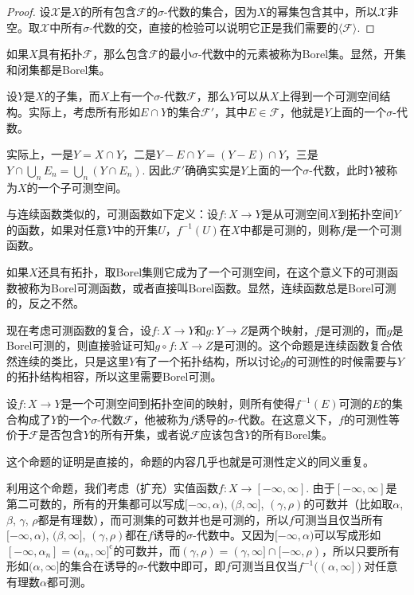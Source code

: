 \begin{proof}
设$\mathscr{X}$是$X$的所有包含$\mathcal{F}$的$\sigma$-代数的集合，因为$X$的幂集包含其中，所以$\mathscr{X}$非空。取$\mathscr{X}$中所有$\sigma$-代数的交，直接的检验可以说明它正是我们需要的$\langle \mathcal{F}\rangle$.
\end{proof}

如果$X$具有拓扑$\mathcal{F}$，那么包含$\mathcal{F}$的最小$\sigma$-代数中的元素被称为Borel集。显然，开集和闭集都是Borel集。

\begin{para}
设$Y$是$X$的子集，而$X$上有一个$\sigma$-代数$\mathcal{F}$，那么$Y$可以从$X$上得到一个可测空间结构。实际上，考虑所有形如$E\cap Y$的集合$\mathcal{F}'$，其中$E\in \mathcal{F}$，他就是$Y$上面的一个$\sigma$-代数。

实际上，一是$Y=X\cap Y$，二是$Y-E\cap Y=(Y-E)\cap Y$，三是$Y\cap \bigcup_n E_n=\bigcup_n (Y\cap E_n)$. 因此$\mathcal{F}'$确确实实是$Y$上面的一个$\sigma$-代数，此时$Y$被称为$X$的一个子可测空间。
\end{para}

\begin{para}
与连续函数类似的，可测函数如下定义：设$f:X\to Y$是从可测空间$X$到拓扑空间$Y$的函数，如果对任意$Y$中的开集$U$，$f^{-1}(U)$在$X$中都是可测的，则称$f$是一个可测函数。

如果$X$还具有拓扑，取Borel集则它成为了一个可测空间，在这个意义下的可测函数被称为Borel可测函数，或者直接叫Borel函数。显然，连续函数总是Borel可测的，反之不然。

现在考虑可测函数的复合，设$f:X\to Y$和$g:Y\to Z$是两个映射，$f$是可测的，而$g$是Borel可测的，则直接验证可知$g\circ f:X\to Z$是可测的。这个命题是连续函数复合依然连续的类比，只是这里$Y$有了一个拓扑结构，所以讨论$g$的可测性的时候需要与$Y$的拓扑结构相容，所以这里需要Borel可测。
\end{para}

\begin{pro}
设$f:X\to Y$是一个可测空间到拓扑空间的映射，则所有使得$f^{-1}(E)$可测的$E$的集合构成了$Y$的一个$\sigma$-代数$\mathcal{F}$，他被称为$f$诱导的$\sigma$-代数。在这意义下，$f$的可测性等价于$\mathcal{F}$是否包含$Y$的所有开集，或者说$\mathcal{F}$应该包含$Y$的所有Borel集。
\end{pro}

这个命题的证明是直接的，命题的内容几乎也就是可测性定义的同义重复。

利用这个命题，我们考虑（扩充）实值函数$f:X\to [-\infty,\infty]$. 由于$[-\infty,\infty]$是第二可数的，所有的开集都可以写成$[-\infty,\alpha)$, $(\beta,\infty]$, $(\gamma,\rho)$的可数并（比如取$\alpha$, $\beta$, $\gamma$, $\rho$都是有理数），而可测集的可数并也是可测的，所以$f$可测当且仅当所有$[-\infty,\alpha)$, $(\beta,\infty]$, $(\gamma,\rho)$都在$f$诱导的$\sigma$-代数中。又因为$[-\infty,\alpha)$可以写成形如$[-\infty,\alpha_n]=(\alpha_n,\infty]^\text{c}$的可数并，而$(\gamma,\rho)=(\gamma,\infty]\cap [-\infty,\rho)$，所以只要所有形如$(\alpha,\infty]$的集合在诱导的$\sigma$-代数中即可，即$f$可测当且仅当$f^{-1}((\alpha,\infty])$对任意有理数$\alpha$都可测。

